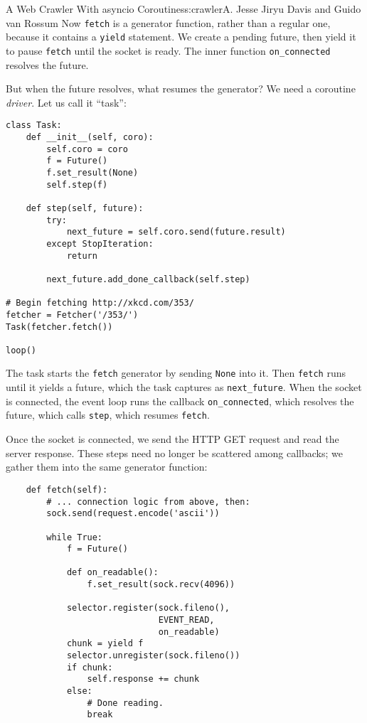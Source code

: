 \begin{aosachapter}{A Web Crawler With asyncio Coroutines}{s:crawler}{A. Jesse Jiryu Davis and Guido van Rossum}
Now \texttt{fetch} is a generator function, rather than a regular one,
because it contains a \texttt{yield} statement. We create a pending
future, then yield it to pause \texttt{fetch} until the socket is ready.
The inner function \texttt{on\_connected} resolves the future.

But when the future resolves, what resumes the generator? We need a
coroutine \emph{driver}. Let us call it ``task'':

\begin{verbatim}
class Task:
    def __init__(self, coro):
        self.coro = coro
        f = Future()
        f.set_result(None)
        self.step(f)

    def step(self, future):
        try:
            next_future = self.coro.send(future.result)
        except StopIteration:
            return

        next_future.add_done_callback(self.step)

# Begin fetching http://xkcd.com/353/
fetcher = Fetcher('/353/')
Task(fetcher.fetch())

loop()
\end{verbatim}

The task starts the \texttt{fetch} generator by sending \texttt{None}
into it. Then \texttt{fetch} runs until it yields a future, which the
task captures as \texttt{next\_future}. When the socket is connected,
the event loop runs the callback \texttt{on\_connected}, which resolves
the future, which calls \texttt{step}, which resumes \texttt{fetch}.

\label{factoring-coroutines-with-yield-from}

Once the socket is connected, we send the HTTP GET request and read the
server response. These steps need no longer be scattered among
callbacks; we gather them into the same generator function:

\begin{verbatim}
    def fetch(self):
        # ... connection logic from above, then:
        sock.send(request.encode('ascii'))

        while True:
            f = Future()

            def on_readable():
                f.set_result(sock.recv(4096))

            selector.register(sock.fileno(),
                              EVENT_READ,
                              on_readable)
            chunk = yield f
            selector.unregister(sock.fileno())
            if chunk:
                self.response += chunk
            else:
                # Done reading.
                break
\end{verbatim}


\end{aosachapter}
